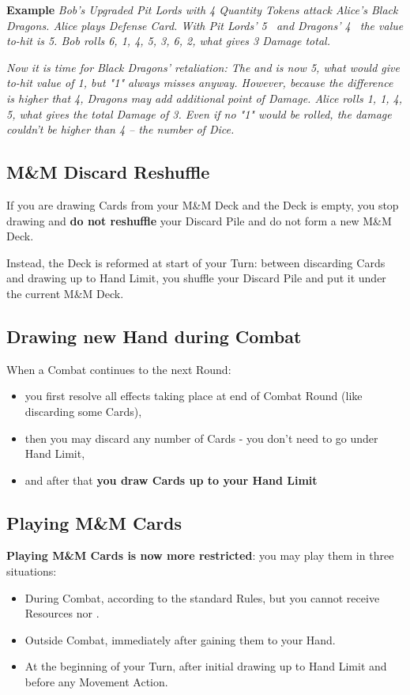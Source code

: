 \begin{multicols*}{2}
    \textbf{Example} \textit{Bob's Upgraded Pit Lords with 4 Quantity Tokens attack Alice's Black Dragons. Alice plays Defense Card. With Pit Lords' 5~ and Dragons' 4~ the value to-hit is 5. Bob rolls 6, 1, 4, 5, 3, 6, 2, what gives 3 Damage total.}
        
    \textit{Now it is time for Black Dragons' retaliation: The  and  is now 5, what would give to-hit value of 1, but "1" always misses anyway. However, because the difference is higher that 4, Dragons may add additional point of Damage. Alice rolls 1, 1, 4, 5, what gives the total Damage of 3. Even if no "1" would be rolled, the damage couldn't be higher than 4 -- the number of Dice.}
    
    \subsection*{M\&M Discard Reshuffle}
    
    If you are drawing Cards from your M\&M Deck and the Deck is empty, you stop drawing and \textbf{do not reshuffle} your Discard Pile and do not form a new M\&M Deck.
    
    Instead, the Deck is reformed at start of your Turn: between discarding Cards and drawing up to Hand Limit, you shuffle your Discard Pile and put it under the current M\&M Deck. 
    
    \subsection*{Drawing new Hand during Combat}
    
    When a Combat continues to the next Round: \begin{itemize}
        \item you first resolve all effects taking place at end of Combat Round (like discarding some  Cards),
        \item then you may discard any number of Cards - you don't need to go under Hand Limit,
        \item and after that \textbf{you draw Cards up to your Hand Limit}
    \end{itemize}
    
    \subsection*{Playing M\&M Cards}
    
    \textbf{Playing M\&M Cards is now more restricted}: you may play them in three situations: \begin{itemize}
        \item During Combat, according to the standard Rules, but you cannot receive Resources nor .
        \item Outside Combat, immediately after gaining them to your Hand.
        \item At the beginning of your Turn, after initial drawing up to Hand Limit and before any Movement Action.
    \end{itemize}
    

\end{multicols*}
